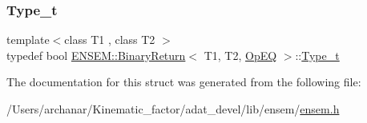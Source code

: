 \mbox{\label{structENSEM_1_1BinaryReturn_3_01T1_00_01T2_00_01OpEQ_01_4_a78e18e010c85e91abd8944d6f76af63d}} 
\subsubsection{\texorpdfstring{Type\_t}{Type\_t}\hspace{0.1cm}{\footnotesize\ttfamily [2/2]}}
{\footnotesize\ttfamily template$<$class T1 , class T2 $>$ \\
typedef bool \mbox{\hyperlink{structENSEM_1_1BinaryReturn}{E\+N\+S\+E\+M\+::\+Binary\+Return}}$<$ T1, T2, \mbox{\hyperlink{structENSEM_1_1OpEQ}{Op\+EQ}} $>$\+::\mbox{\hyperlink{structENSEM_1_1BinaryReturn_3_01T1_00_01T2_00_01OpEQ_01_4_a78e18e010c85e91abd8944d6f76af63d}{Type\+\_\+t}}}



The documentation for this struct was generated from the following file\+:\begin{DoxyCompactItemize}
\item 
/\+Users/archanar/\+Kinematic\+\_\+factor/adat\+\_\+devel/lib/ensem/\mbox{\hyperlink{lib_2ensem_2ensem_8h}{ensem.\+h}}\end{DoxyCompactItemize}
